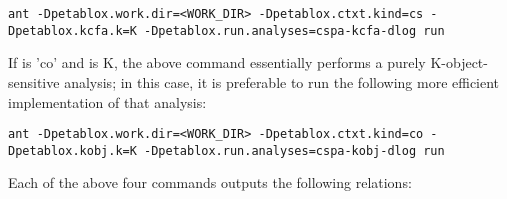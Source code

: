 \begin{framed}
\begin{verbatim}
ant -Dpetablox.work.dir=<WORK_DIR> -Dpetablox.ctxt.kind=cs -Dpetablox.kcfa.k=K -Dpetablox.run.analyses=cspa-kcfa-dlog run
\end{verbatim}
\end{framed}

If  is 'co' and  is K,
the above command essentially performs a purely K-object-sensitive analysis; in
this case, it is preferable to run the following more efficient implementation
of that analysis:

\begin{framed}
\begin{verbatim}
ant -Dpetablox.work.dir=<WORK_DIR> -Dpetablox.ctxt.kind=co -Dpetablox.kobj.k=K -Dpetablox.run.analyses=cspa-kobj-dlog run
\end{verbatim}
\end{framed}

Each of the above four commands outputs the following relations:

